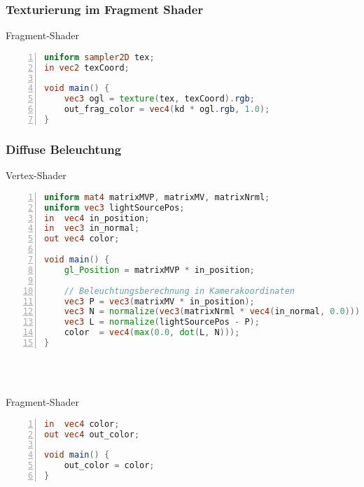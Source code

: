 \subsubsection{Texturierung im Fragment Shader}
\begin{minipage}{\textwidth}
Fragment-Shader
\begin{lstlisting}[frame=single,numbers=left,mathescape,language=GLSL]
uniform sampler2D tex;
in vec2 texCoord;

void main() {
	vec3 ogl = texture(tex, texCoord).rgb;
	out_frag_color = vec4(kd * ogl.rgb, 1.0);
}
\end{lstlisting}
\end{minipage}

\subsubsection{Diffuse Beleuchtung}
\begin{minipage}{\textwidth}
Vertex-Shader
\begin{lstlisting}[frame=single,numbers=left,mathescape,language=GLSL]
uniform mat4 matrixMVP, matrixMV, matrixNrml;
uniform vec3 lightSourcePos;
in  vec4 in_position;
in  vec3 in_normal;
out vec4 color;

void main() {
	gl_Position = matrixMVP * in_position;

	// Beleuchtungsberechnung in Kamerakoordinaten
	vec3 P = vec3(matrixMV * in_position);
	vec3 N = normalize(vec3(matrixNrml * vec4(in_normal, 0.0)));
	vec3 L = normalize(lightSourcePos - P);
	color  = vec4(max(0.0, dot(L, N)));
}
\end{lstlisting}
\end{minipage}
\\\\
\begin{minipage}{\textwidth}
Fragment-Shader
\begin{lstlisting}[frame=single,numbers=left,mathescape,language=GLSL]
in  vec4 color;
out vec4 out_color;

void main() {
	out_color = color;
}
\end{lstlisting}
\end{minipage}

